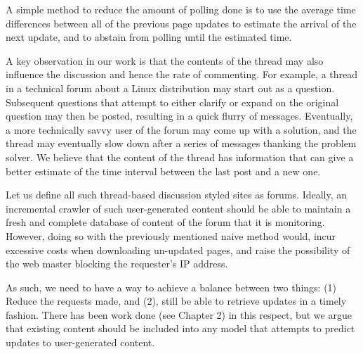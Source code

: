 A simple method to reduce the amount of polling done is to use the
average time differences between all of the previous page updates to estimate 
the arrival of the next update, and to abstain from polling until the
estimated time.


A key observation in our work is that the contents of the thread may
also influence the discussion and hence the rate of commenting. For example, a 
thread in a technical forum about a Linux distribution may start out as a 
question. Subsequent questions that attempt to either clarify or expand on the 
original question may then be posted, resulting in a quick flurry of messages.  
Eventually, a more technically savvy user of the forum may come up with a 
solution, and the thread may eventually slow down after a series of messages 
thanking the problem solver. We believe that the content of the thread has 
information that can give a better estimate of the time interval between the 
last post and a new one.





Let us define all such thread-based discussion styled sites as forums. Ideally, 
an incremental crawler of such user-generated content should be able to maintain 
a fresh and complete database of content of the forum that it is monitoring.  
However, doing so with the previously mentioned naive method would, incur 
excessive costs when downloading un-updated pages, and raise the possibility of 
the web master blocking the requester's IP address.

As such, we need to have a way to achieve a balance between two things: (1) 
Reduce the requests made, and (2), still be able to retrieve updates in a timely 
fashion. There has been work done (see Chapter 2) in this respect, but we argue 
that existing content should be included into any model that attempts to predict 
updates to user-generated content.

